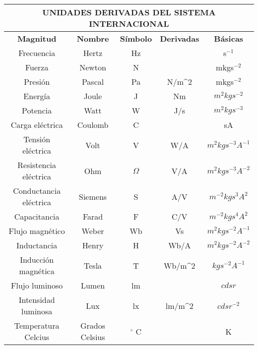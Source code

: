 \begin{center}
    \begin{tabular}{|c|c|c|c|c|}
        \hline
        \multicolumn{5}{|c|}{\textbf{UNIDADES DERIVADAS DEL SISTEMA INTERNACIONAL}} \\
        \hline
        \textbf{Magnitud} & \textbf{Nombre} & \textbf{Símbolo} & \textbf{Derivadas} & \textbf{Básicas} \\
        \hline
        Frecuencia & Hertz & Hz &  & s$^{-1}$ \\
        \hline
        Fuerza & Newton & N &  & mkgs$^{-2}$ \\
        \hline
        Presión & Pascal & Pa & N/m^2 & mkgs$^{-2}$ \\
        \hline
        Energía & Joule & J & Nm & $m^2kgs^{-2}$ \\
        \hline
        Potencia & Watt & W & J/s & $m^2kgs^{-3}$ \\
        \hline
        Carga eléctrica & Coulomb & C &  & sA \\
        \hline
        Tensión eléctrica & Volt & V & W/A & $m^2kgs^{-3}A^{-1}$ \\
        \hline
        Resistencia eléctrica & Ohm & $\Omega$ & V/A & $m^2kgs^{-3}A^{-2}$ \\
        \hline
        Conductancia eléctrica & Siemens & S & A/V & $m^{-2}kgs^{3}A^{2}$ \\
        \hline
        Capacitancia & Farad & F & C/V & $m^{-2}kgs^{4}A^{2}$ \\
        \hline
        Flujo magnético & Weber & Wb & Vs & $m^2kgs^{-2}A^{-1}$ \\
        \hline
        Inductancia & Henry & H & Wb/A & $m^2kgs^{-2}A^{-2}$ \\
        \hline
        Inducción magnética & Tesla & T & Wb/m^2 & $kgs^{-2}A^{-1}$ \\
        Flujo luminoso & Lumen & lm &  & $cdsr$ \\
        \hline
        Intensidad luminosa & Lux & lx & lm/m^2 & $cdsr^{-2}$ \\
        \hline
        Temperatura Celcius & Grados Celsius & $^\circ$ C &  & K \\
        \hline
    \end{tabular}
\end{center}

